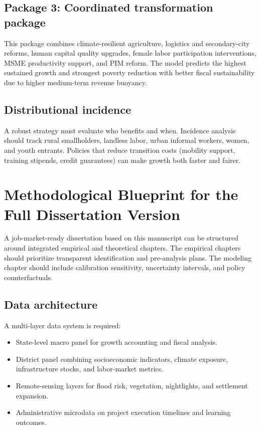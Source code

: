 \documentclass[preprint,12pt]{elsarticle}
\begin{document}
\subsection{Package 3: Coordinated transformation package}
This package combines climate-resilient agriculture, logistics and secondary-city reforms, human capital quality upgrades, female labor participation interventions, MSME productivity support, and PIM reform. The model predicts the highest sustained growth and strongest poverty reduction with better fiscal sustainability due to higher medium-term revenue buoyancy.

\subsection{Distributional incidence}
A robust strategy must evaluate who benefits and when. Incidence analysis should track rural smallholders, landless labor, urban informal workers, women, and youth entrants. Policies that reduce transition costs (mobility support, training stipends, credit guarantees) can make growth both faster and fairer.

\section{Methodological Blueprint for the Full Dissertation Version}
A job-market-ready dissertation based on this manuscript can be structured around integrated empirical and theoretical chapters. The empirical chapters should prioritize transparent identification and pre-analysis plans. The modeling chapter should include calibration sensitivity, uncertainty intervals, and policy counterfactuals.

\subsection{Data architecture}
A multi-layer data system is required:
\begin{itemize}
\item State-level macro panel for growth accounting and fiscal analysis.
\item District panel combining socioeconomic indicators, climate exposure, infrastructure stocks, and labor-market metrics.
\item Remote-sensing layers for flood risk, vegetation, nightlights, and settlement expansion.
\item Administrative microdata on project execution timelines and learning outcomes.
\end{itemize}
\end{document}
